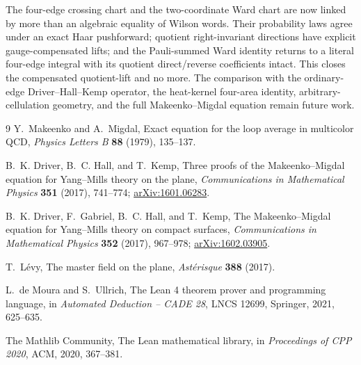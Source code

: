 \documentclass[11pt]{article}
\theoremstyle{definition}
\begin{document}
The four-edge crossing chart and the two-coordinate Ward chart are now linked
by more than an algebraic equality of Wilson words.  Their probability laws
agree under an exact Haar pushforward; quotient right-invariant directions
have explicit gauge-compensated lifts; and the Pauli-summed Ward identity
returns to a literal four-edge integral with its quotient direct/reverse
coefficients intact.  This closes the compensated quotient-lift and no more.
The comparison with the ordinary-edge Driver--Hall--Kemp operator, the
heat-kernel four-area identity, arbitrary-cellulation geometry, and the full
Makeenko--Migdal equation remain future work.

\begin{thebibliography}{9}
Y.~Makeenko and A.~Migdal,
Exact equation for the loop average in multicolor QCD,
\emph{Physics Letters B} \textbf{88} (1979), 135--137.

B.~K. Driver, B.~C. Hall, and T.~Kemp,
Three proofs of the Makeenko--Migdal equation for Yang--Mills theory on the
plane,
\emph{Communications in Mathematical Physics} \textbf{351} (2017), 741--774;
\href{https://arxiv.org/abs/1601.06283}{arXiv:1601.06283}.

B.~K. Driver, F.~Gabriel, B.~C. Hall, and T.~Kemp,
The Makeenko--Migdal equation for Yang--Mills theory on compact surfaces,
\emph{Communications in Mathematical Physics} \textbf{352} (2017), 967--978;
\href{https://arxiv.org/abs/1602.03905}{arXiv:1602.03905}.

T.~L\'evy,
The master field on the plane,
\emph{Ast\'erisque} \textbf{388} (2017).

L.~de Moura and S.~Ullrich,
The Lean 4 theorem prover and programming language,
in \emph{Automated Deduction -- CADE 28}, LNCS 12699, Springer, 2021,
625--635.

The Mathlib Community,
The Lean mathematical library,
in \emph{Proceedings of CPP 2020}, ACM, 2020, 367--381.
\end{thebibliography}
\end{document}
